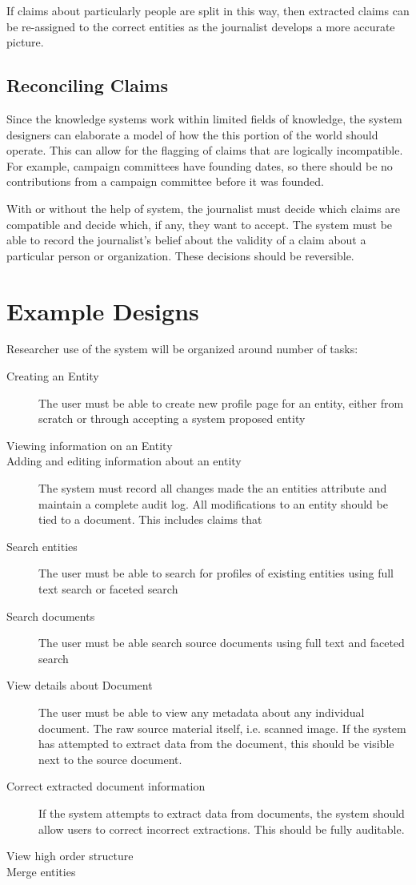 \documentclass[format=siggraph, review=true]{acmart}
\begin{document}
If claims about particularly people are split in this way, then
extracted claims can be re-assigned to the correct entities as the
journalist develops a more accurate picture.


\subsection{Reconciling Claims}
Since the knowledge systems work within limited fields of knowledge,
the system designers can elaborate a model of how the this portion of
the world should operate. This can allow for the flagging of claims
that are logically incompatible. For example, campaign committees have
founding dates, so there should be no contributions from a campaign
committee before it was founded. 

With or without the help of system, the journalist must decide which
claims are compatible and decide which, if any, they want to
accept. The system must be able to record the journalist's belief about
the validity of a claim about a particular person or
organization. These decisions should be reversible.

\section{Example Designs}
Researcher use of the system will be organized around number of tasks:

\begin{description}
\item[Creating an Entity] The user must be able to create new profile
  page for an entity, either from scratch or through accepting a
  system proposed entity
\item[Viewing information on an Entity]
\item[Adding and editing information about an entity] The system must
  record all changes made the an entities attribute and maintain a
  complete audit log. All modifications to an entity should be tied to
  a document. This includes claims that 
\item[Search entities] The user must be able to search for profiles of
  existing entities using full text search or faceted search
\item[Search documents] The user must be able search source documents
  using full text and faceted search
\item[View details about Document] The user must be able to view any
  metadata about any individual document. The raw source material
  itself, i.e. scanned image. If the system has attempted
  to extract data from the document, this should be visible next to
  the source document.
\item[Correct extracted document information] If the system attempts
  to extract data from documents, the system should allow users to
  correct incorrect extractions. This should be fully auditable.
\item[View high order structure]
\item[Merge entities]
\end{description}
\end{document}
